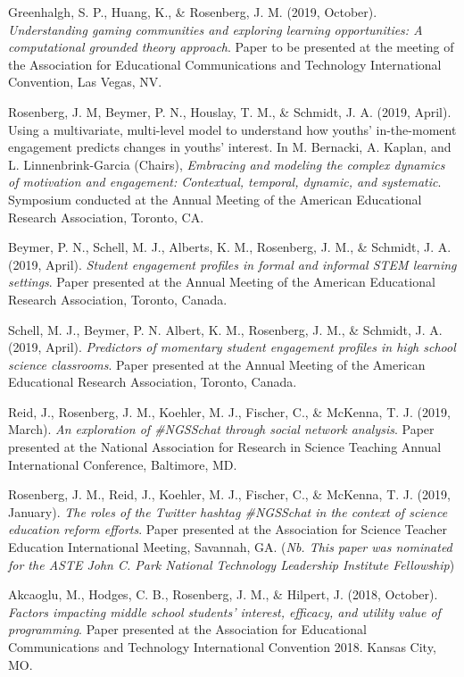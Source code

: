 \documentclass[14,]{article}
\begin{document}
Greenhalgh, S. P., Huang, K., \& Rosenberg, J. M. (2019, October).
\emph{Understanding gaming communities and exploring learning
opportunities: A computational grounded theory approach}. Paper to be
presented at the meeting of the Association for Educational
Communications and Technology International Convention, Las Vegas, NV.

Rosenberg, J. M, Beymer, P. N., Houslay, T. M., \& Schmidt, J. A. (2019,
April). Using a multivariate, multi-level model to understand how
youths' in-the-moment engagement predicts changes in youths' interest.
In M. Bernacki, A. Kaplan, and L. Linnenbrink-Garcia (Chairs),
\emph{Embracing and modeling the complex dynamics of motivation and
engagement: Contextual, temporal, dynamic, and systematic}. Symposium
conducted at the Annual Meeting of the American Educational Research
Association, Toronto, CA.

Beymer, P. N., Schell, M. J., Alberts, K. M., Rosenberg, J. M., \&
Schmidt, J. A. (2019, April). \emph{Student engagement profiles in
formal and informal STEM learning settings}. Paper presented at the
Annual Meeting of the American Educational Research Association,
Toronto, Canada.

Schell, M. J., Beymer, P. N. Albert, K. M., Rosenberg, J. M., \&
Schmidt, J. A. (2019, April). \emph{Predictors of momentary student
engagement profiles in high school science classrooms}. Paper presented
at the Annual Meeting of the American Educational Research Association,
Toronto, Canada.

Reid, J., Rosenberg, J. M., Koehler, M. J., Fischer, C., \& McKenna, T.
J. (2019, March). \emph{An exploration of \#NGSSchat through social
network analysis}. Paper presented at the National Association for
Research in Science Teaching Annual International Conference, Baltimore,
MD.

Rosenberg, J. M., Reid, J., Koehler, M. J., Fischer, C., \& McKenna, T.
J. (2019, January). \emph{The roles of the Twitter hashtag \#NGSSchat in
the context of science education reform efforts}. Paper presented at the
Association for Science Teacher Education International Meeting,
Savannah, GA. (\emph{Nb. This paper was nominated for the ASTE John C.
Park National Technology Leadership Institute Fellowship})

Akcaoglu, M., Hodges, C. B., Rosenberg, J. M., \& Hilpert, J. (2018,
October). \emph{Factors impacting middle school students' interest,
efficacy, and utility value of programming}. Paper presented at the
Association for Educational Communications and Technology International
Convention 2018. Kansas City, MO.
\end{document}
